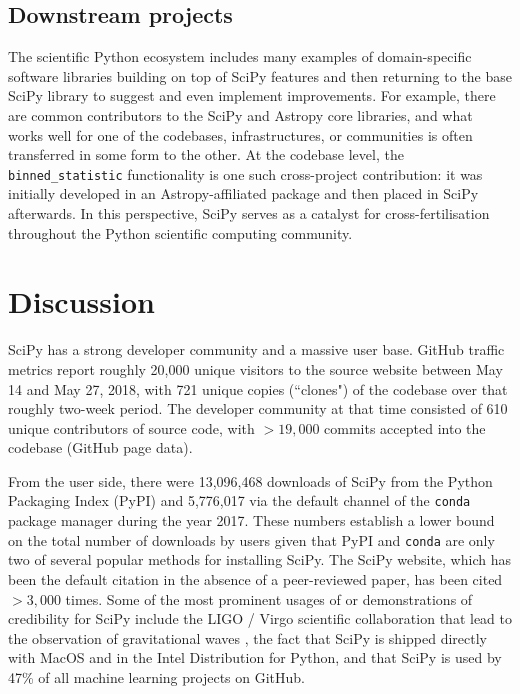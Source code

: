 \documentclass[fleqn,10pt]{wlscirep}
\begin{document}
\subsection*{Downstream projects}

The scientific Python ecosystem includes many examples
of domain-specific software libraries building on top
of SciPy features and then returning to the base SciPy library
to suggest and even implement improvements. 
For example, there are common contributors to the SciPy and 
Astropy core libraries\cite{astropy-2018}, and what works 
well for one of the codebases, infrastructures, or communities
is often transferred in some form to the other. At the codebase
level, the \texttt{binned\_statistic} functionality
is one such cross-project contribution: it was initially
developed in an Astropy-affiliated package
and then placed in SciPy afterwards. 
In this perspective, SciPy serves as a catalyst for cross-fertilisation 
throughout the Python scientific computing community.

\section*{Discussion}


SciPy has a strong developer community and a massive user base. GitHub traffic
metrics report roughly 20,000 unique visitors to the source website between May
14 and May 27, 2018, with 721 unique copies (``clones") of the codebase over
that roughly two-week period. The developer community at that time consisted of 610 unique
contributors of source code, with $>19,000$ commits accepted into the codebase
(GitHub page data).

From the user side, there were 13,096,468 downloads of SciPy from the Python
Packaging Index (PyPI)\cite{pypinfo} and 5,776,017 via the default channel of the
\texttt{conda}\cite{condainfo} package manager during the year 2017. These numbers establish a lower
bound on the total number of downloads by users given that
PyPI and \texttt{conda} are only two of several popular methods for installing SciPy.  The SciPy
website\cite{SciPylib}, which has been the default citation in the absence of a
peer-reviewed paper, has been cited $>3,000$ times\cite{googlescholar}. Some of the most prominent
usages of or demonstrations of credibility for SciPy include the LIGO / Virgo
scientific collaboration that lead to the observation of gravitational waves
\cite{PhysRevLett.116.061102}, the fact that SciPy is shipped directly with
MacOS and in the Intel Distribution for Python\cite{intel-python}, and that SciPy is used
by 47\% of all machine learning projects on GitHub\cite{octoverse-scipy}.
\end{document}
